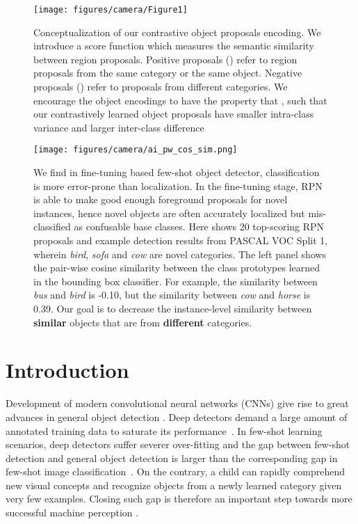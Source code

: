 \documentclass[final]{cvpr}
\begin{document}
\begin{figure}[h]
\begin{center}
\texttt{[image: figures/camera/Figure1]}
\caption{Conceptualization of our contrastive object proposals encoding. We introduce a score function which measures the semantic similarity between region proposals. Positive proposals () refer to region proposals from the same category or the same object. Negative proposals () refer to proposals from different categories. We encourage the object encodings to have the property that , such that our contrastively learned object proposals have smaller intra-class variance and larger inter-class difference}
\vspace{-3mm}
\label{fig:figure1} \end{center}
\end{figure}





\begin{figure*}[t]
\texttt{[image: figures/camera/ai\_pw\_cos\_sim.png]}
\centering
\caption{We find in fine-tuning based few-shot object detector, classification is more error-prone than localization. In the fine-tuning stage, RPN is able to make good enough foreground proposals for novel instances, hence novel objects are often accurately localized but mis-classified as confusable base classes. Here shows 20 top-scoring RPN proposals and example detection results from PASCAL VOC Split 1, wherein \textit{bird}, \textit{sofa} and \textit{cow} are novel categories. The left panel shows the pair-wise cosine similarity between the class prototypes learned in the bounding box classifier. For example, the similarity between \textit{bus} and \textit{bird} is -0.10, but the similarity between \textit{cow} and \textit{horse} is 0.39. Our goal is to decrease the instance-level similarity between \textbf{similar} objects that are from \textbf{different} categories.}\label{fig:pw-sim}\end{figure*}



\vspace{-4mm}
\section{Introduction}
Development of modern convolutional neural networks (CNNs) \cite{he_deep_2015,cai_cascade_2017,zhu_deformable_2018} give rise to great advances in general object detection \cite{ren_faster_2016,lin_focal_2018,tian_fcos_2019}. Deep detectors demand a large amount of annotated training data to saturate its performance~\cite{tan_efficientdet_2020,wang_cspnet_2019}. In few-shot learning scenarios, deep detectors suffer severer over-fitting and the gap between few-shot detection and general object detection is larger than the corresponding gap in few-shot image classification~\cite{wang_low-shot_2018,khodadadeh_unsupervised_2019,ren_meta-learning_2018}. On the contrary, a child can rapidly comprehend new visual concepts and recognize objects from a newly learned category given very few examples. Closing such gap is therefore an important step towards more successful machine perception \cite{funke_five_2020}. 
\end{document}
